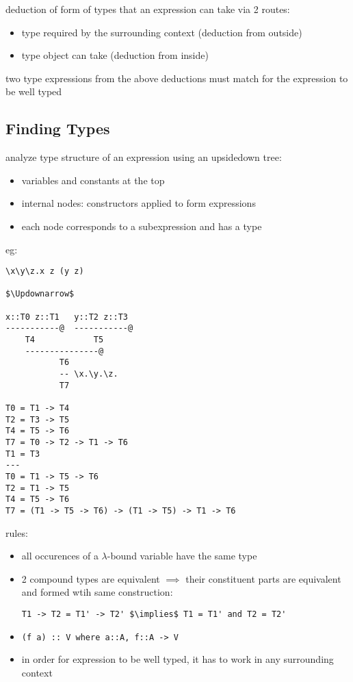 \documentclass[8pt]{extarticle}
\begin{document}
\begin{multicols*}{2}

deduction of form of types that an expression can take via 2 routes:
\begin{itemize}
\item type required by the surrounding context (deduction from outside)
\item type object can take (deduction from inside)
\end{itemize}
two type expressions from the above deductions must match for the expression to be well typed

\subsection{Finding Types}

analyze type structure of an expression using an upsidedown tree:
\begin{itemize}
\item variables and constants at the top
\item internal nodes: constructors applied to form expressions
\item each node corresponds to a subexpression and has a type
\end{itemize}

eg:
\begin{lstlisting}
\x\y\z.x z (y z)

$\Updownarrow$

x::T0 z::T1   y::T2 z::T3
-----------@  -----------@
    T4            T5
    ---------------@
           T6
           -- \x.\y.\z.
           T7

T0 = T1 -> T4
T2 = T3 -> T5
T4 = T5 -> T6
T7 = T0 -> T2 -> T1 -> T6
T1 = T3
---
T0 = T1 -> T5 -> T6
T2 = T1 -> T5
T4 = T5 -> T6
T7 = (T1 -> T5 -> T6) -> (T1 -> T5) -> T1 -> T6
\end{lstlisting}
         
rules:
\begin{itemize}
\item all occurences of a $\lambda$-bound variable have the same type
\item 2 compound types are equivalent $\implies$ their constituent parts are equivalent and formed wtih same construction:
\begin{lstlisting}
T1 -> T2 = T1' -> T2' $\implies$ T1 = T1' and T2 = T2'
\end{lstlisting}
\item \verb|(f a) :: V where a::A, f::A -> V|
\item in order for expression to be well typed, it has to work in any surrounding context
\end{itemize}


\end{multicols*}
\end{document}
